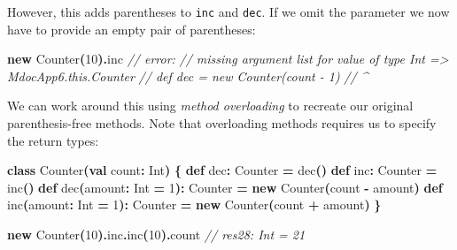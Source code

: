 \documentclass[11pt,a5paper,]{book}
\newenvironment{Shaded}{\begin{snugshade}}{\end{snugshade}}
\newcommand{\BuiltInTok}[1]{#1}
\newcommand{\CommentTok}[1]{\textcolor[rgb]{0.56,0.35,0.01}{\textit{#1}}}
\newcommand{\DecValTok}[1]{\textcolor[rgb]{0.00,0.00,0.81}{#1}}
\newcommand{\FunctionTok}[1]{\textcolor[rgb]{0.00,0.00,0.00}{#1}}
\newcommand{\KeywordTok}[1]{\textcolor[rgb]{0.13,0.29,0.53}{\textbf{#1}}}
\newcommand{\NormalTok}[1]{#1}
\newcommand{\OperatorTok}[1]{\textcolor[rgb]{0.81,0.36,0.00}{\textbf{#1}}}
\begin{document}
However, this adds parentheses to \texttt{inc} and \texttt{dec}. If we
omit the parameter we now have to provide an empty pair of parentheses:

\begin{Shaded}
\begin{Highlighting}[]
\KeywordTok{new} \FunctionTok{Counter}\OperatorTok{(}\DecValTok{10}\OperatorTok{).}\NormalTok{inc}
\CommentTok{// error:}
\CommentTok{// missing argument list for value of type Int =\textgreater{} MdocApp6.this.Counter}
\CommentTok{//   def dec = new Counter(count {-} 1)}
\CommentTok{//             \^{}}
\end{Highlighting}
\end{Shaded}

We can work around this using \emph{method overloading} to recreate our
original parenthesis-free methods. Note that overloading methods
requires us to specify the return types:

\begin{Shaded}
\begin{Highlighting}[]
\KeywordTok{class} \FunctionTok{Counter}\OperatorTok{(}\KeywordTok{val}\NormalTok{ count}\OperatorTok{:} \BuiltInTok{Int}\OperatorTok{)} \OperatorTok{\{}
  \KeywordTok{def}\NormalTok{ dec}\OperatorTok{:}\NormalTok{ Counter }\OperatorTok{=} \FunctionTok{dec}\OperatorTok{()}
  \KeywordTok{def}\NormalTok{ inc}\OperatorTok{:}\NormalTok{ Counter }\OperatorTok{=} \FunctionTok{inc}\OperatorTok{()}
  \KeywordTok{def} \FunctionTok{dec}\OperatorTok{(}\NormalTok{amount}\OperatorTok{:} \BuiltInTok{Int} \OperatorTok{=} \DecValTok{1}\OperatorTok{):}\NormalTok{ Counter }\OperatorTok{=} \KeywordTok{new} \FunctionTok{Counter}\OperatorTok{(}\NormalTok{count }\OperatorTok{{-}}\NormalTok{ amount}\OperatorTok{)}
  \KeywordTok{def} \FunctionTok{inc}\OperatorTok{(}\NormalTok{amount}\OperatorTok{:} \BuiltInTok{Int} \OperatorTok{=} \DecValTok{1}\OperatorTok{):}\NormalTok{ Counter }\OperatorTok{=} \KeywordTok{new} \FunctionTok{Counter}\OperatorTok{(}\NormalTok{count }\OperatorTok{+}\NormalTok{ amount}\OperatorTok{)}
\OperatorTok{\}}
\end{Highlighting}
\end{Shaded}

\begin{Shaded}
\begin{Highlighting}[]
\KeywordTok{new} \FunctionTok{Counter}\OperatorTok{(}\DecValTok{10}\OperatorTok{).}\NormalTok{inc}\OperatorTok{.}\FunctionTok{inc}\OperatorTok{(}\DecValTok{10}\OperatorTok{).}\NormalTok{count}
\CommentTok{// res28: Int = 21}
\end{Highlighting}
\end{Shaded}
\end{document}
